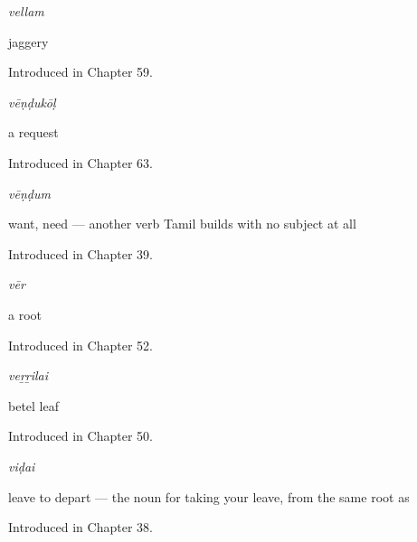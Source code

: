 \noindent\begin{minipage}[t]{\linewidth}
\raggedright
\textbf{}\enspace\emph{vellam}\par
\small jaggery\par
\footnotesize Introduced in Chapter 59.
\end{minipage}\par\medskip

\noindent\begin{minipage}[t]{\linewidth}
\raggedright
\textbf{}\enspace\emph{vēṇḍukōḷ}\par
\small a request\par
\footnotesize Introduced in Chapter 63.
\end{minipage}\par\medskip

\noindent\begin{minipage}[t]{\linewidth}
\raggedright
\textbf{}\enspace\emph{vēṇḍum}\par
\small want, need — another verb Tamil builds with no subject at all\par
\footnotesize Introduced in Chapter 39.
\end{minipage}\par\medskip

\noindent\begin{minipage}[t]{\linewidth}
\raggedright
\textbf{}\enspace\emph{vēr}\par
\small a root\par
\footnotesize Introduced in Chapter 52.
\end{minipage}\par\medskip

\noindent\begin{minipage}[t]{\linewidth}
\raggedright
\textbf{}\enspace\emph{veṟṟilai}\par
\small betel leaf\par
\footnotesize Introduced in Chapter 50.
\end{minipage}\par\medskip

\noindent\begin{minipage}[t]{\linewidth}
\raggedright
\textbf{}\enspace\emph{viḍai}\par
\small leave to depart — the noun for taking your leave, from the same root as \par
\footnotesize Introduced in Chapter 38.
\end{minipage}\par\medskip

